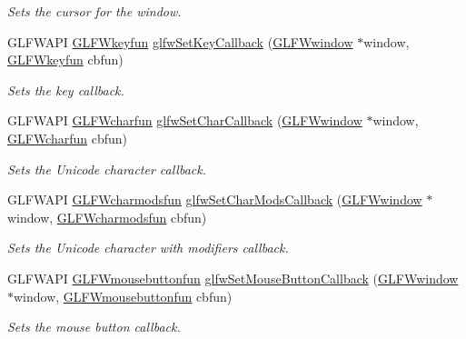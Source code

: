 \begin{DoxyCompactItemize}
\begin{DoxyCompactList}\small\item\em Sets the cursor for the window. \end{DoxyCompactList}\item 
G\+L\+F\+W\+A\+PI \hyperlink{group__input_ga0192a232a41e4e82948217c8ba94fdfd}{G\+L\+F\+Wkeyfun} \hyperlink{group__input_gaa73bb92f628a2a0be9c132d56f19362c}{glfw\+Set\+Key\+Callback} (\hyperlink{group__window_ga3c96d80d363e67d13a41b5d1821f3242}{G\+L\+F\+Wwindow} $\ast$window, \hyperlink{group__input_ga0192a232a41e4e82948217c8ba94fdfd}{G\+L\+F\+Wkeyfun} cbfun)
\begin{DoxyCompactList}\small\item\em Sets the key callback. \end{DoxyCompactList}\item 
G\+L\+F\+W\+A\+PI \hyperlink{group__input_gabf24451c7ceb1952bc02b17a0d5c3e5f}{G\+L\+F\+Wcharfun} \hyperlink{group__input_ga07b2959b23dc3e466ce7475746021002}{glfw\+Set\+Char\+Callback} (\hyperlink{group__window_ga3c96d80d363e67d13a41b5d1821f3242}{G\+L\+F\+Wwindow} $\ast$window, \hyperlink{group__input_gabf24451c7ceb1952bc02b17a0d5c3e5f}{G\+L\+F\+Wcharfun} cbfun)
\begin{DoxyCompactList}\small\item\em Sets the Unicode character callback. \end{DoxyCompactList}\item 
G\+L\+F\+W\+A\+PI \hyperlink{group__input_gae36fb6897d2b7df9b128900c8ce9c507}{G\+L\+F\+Wcharmodsfun} \hyperlink{group__input_gae6eee0bda7429bfe8028615847cf6795}{glfw\+Set\+Char\+Mods\+Callback} (\hyperlink{group__window_ga3c96d80d363e67d13a41b5d1821f3242}{G\+L\+F\+Wwindow} $\ast$window, \hyperlink{group__input_gae36fb6897d2b7df9b128900c8ce9c507}{G\+L\+F\+Wcharmodsfun} cbfun)
\begin{DoxyCompactList}\small\item\em Sets the Unicode character with modifiers callback. \end{DoxyCompactList}\item 
G\+L\+F\+W\+A\+PI \hyperlink{group__input_ga39893a4a7e7c3239c98d29c9e084350c}{G\+L\+F\+Wmousebuttonfun} \hyperlink{group__input_ga20e5ba1ce4e086aedd48a06dc311c95f}{glfw\+Set\+Mouse\+Button\+Callback} (\hyperlink{group__window_ga3c96d80d363e67d13a41b5d1821f3242}{G\+L\+F\+Wwindow} $\ast$window, \hyperlink{group__input_ga39893a4a7e7c3239c98d29c9e084350c}{G\+L\+F\+Wmousebuttonfun} cbfun)
\begin{DoxyCompactList}\small\item\em Sets the mouse button callback. \end{DoxyCompactList}\item 

\end{DoxyCompactItemize}
